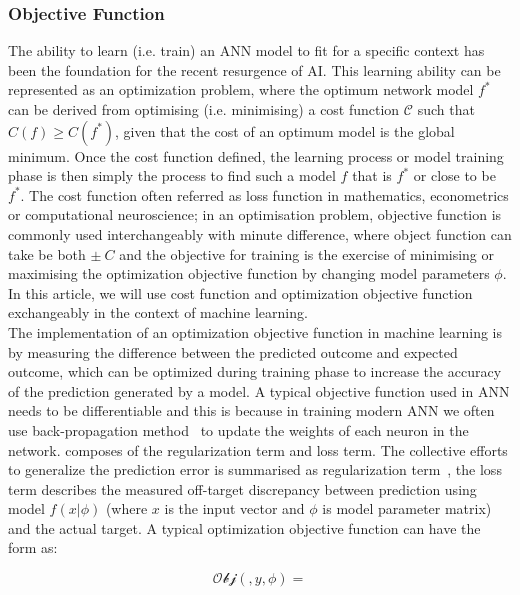 \subsubsection{Objective Function}
The ability to learn (i.e. train) an ANN model to fit for a specific context has been the foundation for the recent resurgence of AI. This learning ability can be represented as an optimization problem, where the optimum network model $f^*$ can be derived from optimising (i.e. minimising) a cost function $\mathcal{C}$ such that $C(f) \geq C(f^*)$, given that the cost of an optimum model is the global minimum. Once the cost function defined, the learning process or model training phase is then simply the process to find such a model $f$ that is $f^*$ or close to be $f^*$. The cost function often referred as loss function in mathematics, econometrics or computational neuroscience; in an optimisation problem, objective function is commonly used interchangeably with minute difference, where object function can take be both $\pm~C$ and the objective for training is the exercise of minimising or maximising the optimization objective function by changing model parameters $\phi$. In this article, we will use cost function and optimization objective function exchangeably in the context of machine learning.
\\
The implementation of an optimization objective function in machine learning is by measuring the difference between the predicted outcome and expected outcome, which can be optimized during training phase to increase the accuracy of the prediction generated by a model. A typical objective function used in ANN needs to be differentiable and this is because in training modern ANN we often use back-propagation method~\cite{LeCun_2015,Heaton_2017} to update the weights of each neuron in the network. composes of the regularization term and loss term. The collective efforts to generalize the prediction error is summarised as regularization term~\cite{goodfellow_2015}, the loss term describes the measured off-target discrepancy between prediction using model $f(x|\phi)$ (where $x$ is the input vector and $\phi$ is model parameter matrix) and the actual target. A typical optimization objective function can have the form as:

\begin{equation}
    \mathcal{Obj}(,y,\phi) = 
\end{equation}